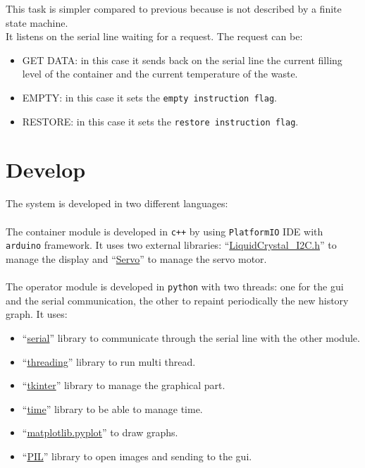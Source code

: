 \documentclass[a4paper,12pt]{report}
\begin{document}
            This task is simpler compared to previous because is not described by a finite state machine.\\
            It listens on the serial line waiting for a request. The request can be:
            \begin{itemize}
                \item GET DATA: in this case it sends back on the serial line the current filling level of the container and the current temperature of the waste.
                \item EMPTY: in this case it sets the \texttt{empty instruction flag}.
                \item RESTORE: in this case it sets the \texttt{restore instruction flag}.
            \end{itemize}

\chapter{Develop}

    The system is developed in two different languages:\\\\
    The container module is developed in \texttt{c++} by using \texttt{PlatformIO} IDE with \texttt{arduino} framework. It uses two external libraries: ``\href{https://github.com/johnrickman/LiquidCrystal_I2C}{LiquidCrystal\_I2C.h}'' to manage the display and ``\href{https://docs.arduino.cc/libraries/servo/}{Servo}'' to manage the servo motor.\\\\
    The operator module is developed in \texttt{python} with two threads: one for the gui and the serial communication, the other to repaint periodically the new history graph. It uses:
    \begin{itemize}
        \item ``\href{https://pyserial.readthedocs.io/en/latest/pyserial.html}{serial}'' library to communicate through the serial line with the other module.
        \item ``\href{https://docs.python.org/3/library/threading.html}{threading}'' library to run multi thread.
        \item ``\href{https://docs.python.org/3/library/tkinter.html}{tkinter}'' library to manage the graphical part.
        \item ``\href{https://docs.python.org/3/library/time.html}{time}'' library to be able to manage time.
        \item ``\href{https://matplotlib.org/3.5.3/api/_as_gen/matplotlib.pyplot.html}{matplotlib.pyplot}'' to draw graphs.
        \item ``\href{https://pillow.readthedocs.io/en/stable/}{PIL}'' library to open images and sending to the gui.
    \end{itemize}
\end{document}
